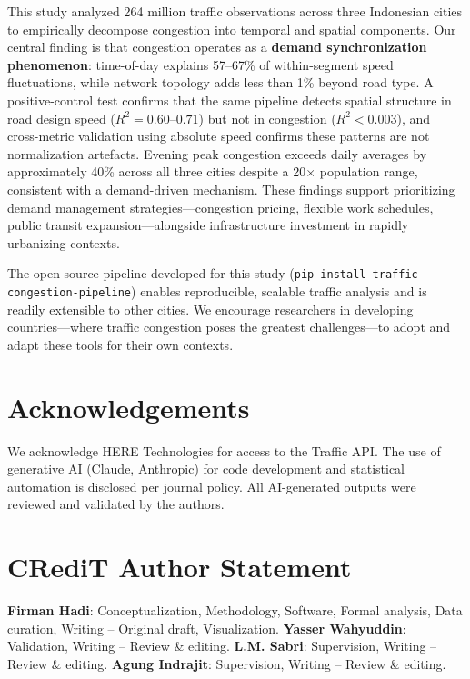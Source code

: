 \documentclass[12pt,a4paper]{article}
\begin{document}
This study analyzed 264 million traffic observations across three Indonesian cities to empirically decompose congestion into temporal and spatial components. Our central finding is that congestion operates as a \textbf{demand synchronization phenomenon}: time-of-day explains 57--67\% of within-segment speed fluctuations, while network topology adds less than 1\% beyond road type. A positive-control test confirms that the same pipeline detects spatial structure in road design speed ($R^2 = 0.60$--$0.71$) but not in congestion ($R^2 < 0.003$), and cross-metric validation using absolute speed confirms these patterns are not normalization artefacts. Evening peak congestion exceeds daily averages by approximately 40\% across all three cities despite a 20$\times$ population range, consistent with a demand-driven mechanism. These findings support prioritizing demand management strategies---congestion pricing, flexible work schedules, public transit expansion---alongside infrastructure investment in rapidly urbanizing contexts.

The open-source pipeline developed for this study (\texttt{pip install traffic-congestion-pipeline}) enables reproducible, scalable traffic analysis and is readily extensible to other cities. We encourage researchers in developing countries---where traffic congestion poses the greatest challenges---to adopt and adapt these tools for their own contexts.

\section{Acknowledgements}

We acknowledge HERE Technologies for access to the Traffic API. The use of generative AI (Claude, Anthropic) for code development and statistical automation is disclosed per journal policy. All AI-generated outputs were reviewed and validated by the authors.

\section{CRediT Author Statement}

\textbf{Firman Hadi}: Conceptualization, Methodology, Software, Formal analysis, Data curation, Writing -- Original draft, Visualization.
\textbf{Yasser Wahyuddin}: Validation, Writing -- Review \& editing.
\textbf{L.M. Sabri}: Supervision, Writing -- Review \& editing.
\textbf{Agung Indrajit}: Supervision, Writing -- Review \& editing.
\end{document}
